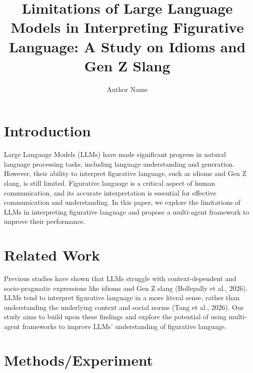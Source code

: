 \documentclass{article}
\begin{document}
\title{Limitations of Large Language Models in Interpreting Figurative Language: A Study on Idioms and Gen Z Slang}

\author{Author Name}


\section{Introduction}

Large Language Models (LLMs) have made significant progress in natural language processing tasks, including language understanding and generation. However, their ability to interpret figurative language, such as idioms and Gen Z slang, is still limited. Figurative language is a critical aspect of human communication, and its accurate interpretation is essential for effective communication and understanding. In this paper, we explore the limitations of LLMs in interpreting figurative language and propose a multi-agent framework to improve their performance.

\section{Related Work}

Previous studies have shown that LLMs struggle with context-dependent and socio-pragmatic expressions like idioms and Gen Z slang (Bollepally et al., 2026). LLMs tend to interpret figurative language in a more literal sense, rather than understanding the underlying context and social norms (Tang et al., 2026). Our study aims to build upon these findings and explore the potential of using multi-agent frameworks to improve LLMs' understanding of figurative language.

\section{Methods/Experiment}
\end{document}
